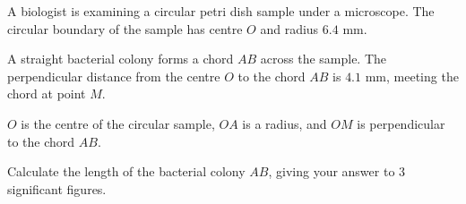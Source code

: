 \documentclass[11pt]{article}
\begin{document}
\begin{question}
\noindent A biologist is examining a circular petri dish sample under a microscope. The circular boundary of the sample has centre $O$ and radius $6.4$ mm.

A straight bacterial colony forms a chord $AB$ across the sample. The perpendicular distance from the centre $O$ to the chord $AB$ is $4.1$ mm, meeting the chord at point $M$.

\begin{center}
\end{center}

\noindent $O$ is the centre of the circular sample, $OA$ is a radius, and $OM$ is perpendicular to the chord $AB$.

Calculate the length of the bacterial colony $AB$, giving your answer to 3 significant figures.

\vspace{4cm}

\begin{flushright}
\end{flushright}
\end{question}
\end{document}
